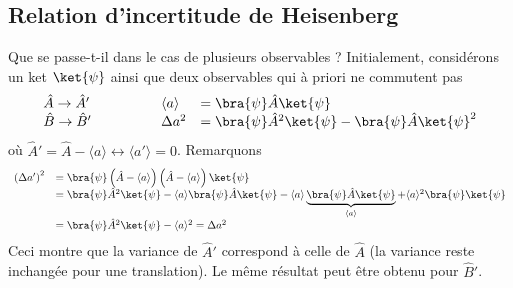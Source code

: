  \subsection{Relation d'incertitude de Heisenberg}
 Que se passe-t-il dans le cas de plusieurs observables ?
 Initialement, considérons un ket $\ket{\psi}$ ainsi que deux observables qui 
 à priori ne commutent pas
 \begin{equation}
 \begin{array}{lll}
 \hat{A}\rightarrow\hat{A}'\qquad\qquad &\langle a\rangle &= \bra{\psi}\hat{A}\ket{\psi}\\
 \hat{B}\rightarrow\hat{B}'\qquad\qquad &\Delta a^2 &= \bra{\psi}\hat{A}^2\ket{\psi}
 -\bra{\psi}\hat{A}\ket{\psi}^2
 \end{array}
 \end{equation}
 où $\hat{A}' = \hat{A}-\langle a\rangle \leftrightarrow \langle a'\rangle=0$. Remarquons 
 \begin{equation}
 \begin{array}{ll}
 \left(\Delta a'\right)^2 &= \bra{\psi}\left(\hat{A}-\langle a\rangle\right)
 \left(\hat{A}-\langle a\rangle\right)\ket{\psi}\\
 &= \bra{\psi}\hat{A}^2\ket{\psi} - \langle a\rangle\bra{\psi}\hat{A}\ket{\psi}-\langle a
 \rangle\underbrace{\bra{\psi}\hat{A}\ket{\psi}}_{\langle a\rangle} + \langle a\rangle^2\bra{\psi}\ket{\psi}\\
 &= \bra{\psi}\hat{A}^2\ket{\psi} - \langle a\rangle^2 = \Delta a^2
 \end{array}
 \end{equation}
 Ceci montre que la variance de $\hat{A}'$ correspond à celle de $\hat{A}$ (la variance reste 
 inchangée pour une translation). Le même résultat peut être obtenu pour $\hat{B}'$.\\
 
